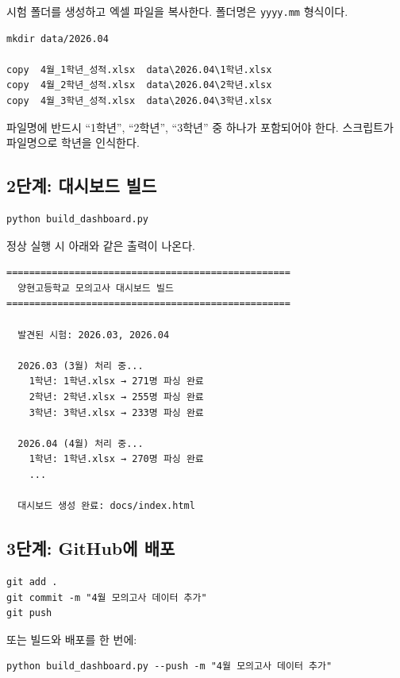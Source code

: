 \documentclass[11pt,a4paper]{article}
\begin{document}
시험 폴더를 생성하고 엑셀 파일을 복사한다. 폴더명은 \texttt{yyyy.mm} 형식이다.

\begin{lstlisting}
mkdir data/2026.04

copy  4월_1학년_성적.xlsx  data\2026.04\1학년.xlsx
copy  4월_2학년_성적.xlsx  data\2026.04\2학년.xlsx
copy  4월_3학년_성적.xlsx  data\2026.04\3학년.xlsx
\end{lstlisting}

\begin{warnbox}
파일명에 반드시 ``1학년'', ``2학년'', ``3학년'' 중 하나가 포함되어야 한다. 스크립트가 파일명으로 학년을 인식한다.
\end{warnbox}

\subsection{2단계: 대시보드 빌드}

\begin{lstlisting}
python build_dashboard.py
\end{lstlisting}

정상 실행 시 아래와 같은 출력이 나온다.

\begin{lstlisting}
==================================================
  양현고등학교 모의고사 대시보드 빌드
==================================================

  발견된 시험: 2026.03, 2026.04

  2026.03 (3월) 처리 중...
    1학년: 1학년.xlsx → 271명 파싱 완료
    2학년: 2학년.xlsx → 255명 파싱 완료
    3학년: 3학년.xlsx → 233명 파싱 완료

  2026.04 (4월) 처리 중...
    1학년: 1학년.xlsx → 270명 파싱 완료
    ...

  대시보드 생성 완료: docs/index.html
\end{lstlisting}

\subsection{3단계: GitHub에 배포}

\begin{lstlisting}
git add .
git commit -m "4월 모의고사 데이터 추가"
git push
\end{lstlisting}

또는 빌드와 배포를 한 번에:

\begin{lstlisting}
python build_dashboard.py --push -m "4월 모의고사 데이터 추가"
\end{lstlisting}
\end{document}
